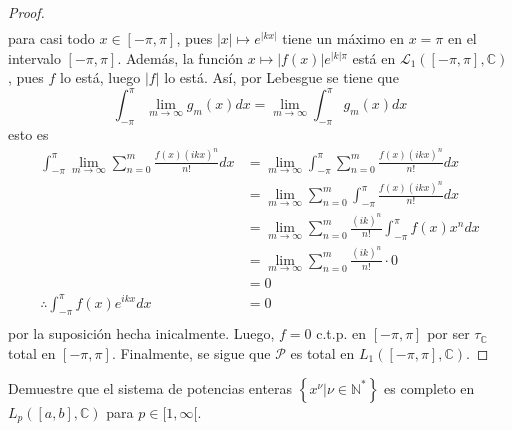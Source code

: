 \documentclass[12pt]{report}
\newcounter{it}
\theoremstyle{largebreak}
\newcommand\abs[1]{\ensuremath{\left|#1\right|}}
\begin{document}
\begin{proof}
\begin{equation*}
\begin{split}
            \end{split}
        \end{equation*}
        para casi todo $x\in[-\pi,\pi]$, pues $\abs{x}\mapsto e^{\abs{kx}}$ tiene un máximo en $x=\pi$ en el intervalo $[-\pi,\pi]$. Además, la función $x\mapsto \abs{f(x)}e^{\abs{k}\pi}$ está en $\mathcal{L}_1([-\pi,\pi],\mathbb{C})$, pues $f$ lo está, luego $\abs{f}$ lo está. Así, por Lebesgue se tiene que
        \begin{equation*}
            \int_{ -\pi}^{\pi}\lim_{ m\rightarrow\infty}g_m(x)dx=\lim_{ m\rightarrow\infty}\int_{ -\pi}^{\pi} g_m(x)dx
        \end{equation*}
        esto es
        \begin{equation*}
            \begin{split}
                \int_{-\pi}^\pi\lim_{ m\rightarrow\infty}\sum_{ n=0}^m\frac{f(x)(ikx)^n}{n!}dx&=\lim_{ m\rightarrow\infty}\int_{ -\pi}^{\pi}\sum_{ n=0}^m\frac{f(x)(ikx)^n}{n!}dx\\
                &=\lim_{ m\rightarrow\infty}\sum_{ n=0}^m\int_{ -\pi}^{\pi}\frac{f(x)(ikx)^n}{n!}dx\\
                &=\lim_{ m\rightarrow\infty}\sum_{ n=0}^m\frac{(ik)^n}{n!}\int_{ -\pi}^{\pi}f(x)x^n dx\\
                &=\lim_{ m\rightarrow\infty}\sum_{ n=0}^m\frac{(ik)^n}{n!}\cdot0 \\
                &=0\\
                \therefore \int_{-\pi}^\pi f(x)e^{ ikx}dx&=0\\
            \end{split}
        \end{equation*}
        por la suposición hecha inicalmente. Luego, $f=0$ c.t.p. en $[-\pi,\pi]$ por ser $\tau_{\mathbb{C}}$ total en $[-\pi,\pi]$. Finalmente, se sigue que $\mathcal{P}$ es total en $L_1([-\pi,\pi],\mathbb{C})$.
    \end{proof}

    \begin{excer}
        Demuestre que el sistema de potencias enteras $\left\{x^\nu\Big|\nu\in\mathbb{N}^* \right\}$ es completo en $L_p([a,b],\mathbb{C})$ para $p\in[1,\infty[$.
    \end{excer}
\end{document}
